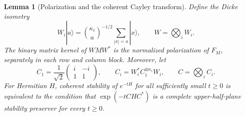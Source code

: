 \documentclass[reqno]{amsart}
\newtheorem{lemma}[theorem]{Lemma}
\theoremstyle{definition}
\theoremstyle{remark}
\begin{document}
\begin{lemma}[Polarization and the coherent Cayley transform]
\label{spin:cayley}
Define the Dicke isometry
\begin{equation}\label{spin:dicke}
 W_i|a\rangle=\binom{\kappa_i}{a}^{-1/2}
                  \sum_{|x|=a}|x\rangle,\qquad W=\bigotimes_iW_i.
\end{equation}
The binary matrix kernel of $WMW^*$ is the normalized polarization of
$F_M$, separately in each row and column block.  Moreover, let
\begin{equation}\label{spin:cayley-matrix}
 C_1=\frac1{\sqrt2}\begin{pmatrix}i&-i\\1&1\end{pmatrix},\qquad
 C_i=W_i^*C_1^{\otimes\kappa_i}W_i,\qquad C=\bigotimes_iC_i.
\end{equation}
For Hermitian $H$, coherent stability of $e^{-tH}$ for all sufficiently
small $t\geq0$ is equivalent to the condition that
$\exp(-tCHC^*)$ is a complete upper-half-plane stability preserver for
every $t\geq0$.
\end{lemma}
\end{document}
